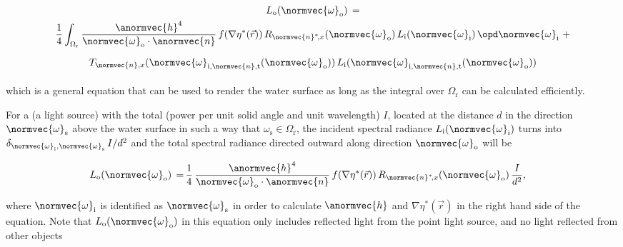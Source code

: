 \begin{equation} \label{eq:rendering_equation_simplified}
\renewcommand*{\arraystretch}{2}
\begin{array}{cl}
L_{\text{o}}(\normvec{\omega}_{\text{o}}) \,= \\
\displaystyle \frac{1}{4}\int_{\Omega_{\text{r}}} \frac{\anormvec{h}^4}{\normvec{\omega}_{\text{o}}\cdot\anormvec{n}}\,f(\nabla\eta^*(\vec{r}))\,R_{\normvec{n}^*\!,x}(\normvec{\omega}_{\text{o}})\, L_{\text{i}}(\normvec{\omega}_{\text{i}})\,\opd \normvec{\omega}_{\text{i}} \ + \\[1ex]
\displaystyle T_{\normvec{n},x}(\normvec{\omega}_{\text{i},\normvec{n},\text{t}}(\normvec{\omega}_{\text{o}}))\, L_{\text{i}}(\normvec{\omega}_{\text{i},\normvec{n},\text{t}}(\normvec{\omega}_{\text{o}}))
\end{array}
\end{equation}

which is a general equation that can be used to render the water surface as long as the integral over $\Omega_{\text{r}}$ can be calculated efficiently.

For a  (a light source) with the total  (power per unit solid angle and unit wavelength) $I$, located at the distance $d$ in the direction $\normvec{\omega}_{\text{s}}$ above the water surface in such a way that $\omega_{\text{s}} \in \Omega_{\text{r}}$, the incident spectral radiance $L_{\text{i}}(\normvec{\omega}_{\text{i}})$ turns into $\delta_{\normvec{\omega}_{\text{i}},\normvec{\omega}_{\text{s}}}\,I/d^2$ and the total spectral radiance directed outward along direction $\normvec{\omega}_{\text{o}}$ will be

\begin{equation} \label{eq:spectral_radience_reflected_point_light_source}
\renewcommand*{\arraystretch}{2}
\begin{aligned}
\displaystyle L_{\text{o}}(\normvec{\omega}_{\text{o}}) \,=\, & \frac{1}{4}\,\frac{\anormvec{h}^4}{\normvec{\omega}_{\text{o}}\cdot\anormvec{n}}\,f(\nabla\eta^*(\vec{r}))\,R_{\normvec{n}^*\!,x}(\normvec{\omega}_{\text{o}})\,\frac{I}{d^2},
\end{aligned}
\end{equation}

where $\normvec{\omega}_{\text{i}}$ is identified as $\normvec{\omega}_{\text{s}}$ in order to calculate $\anormvec{h}$ and $\nabla\eta^*(\vec{r})$ in the right hand side of the equation. Note that $L_{\text{o}}(\normvec{\omega}_{\text{o}})$ in this equation only includes reflected light from the point light source, and no light reflected from other objects

